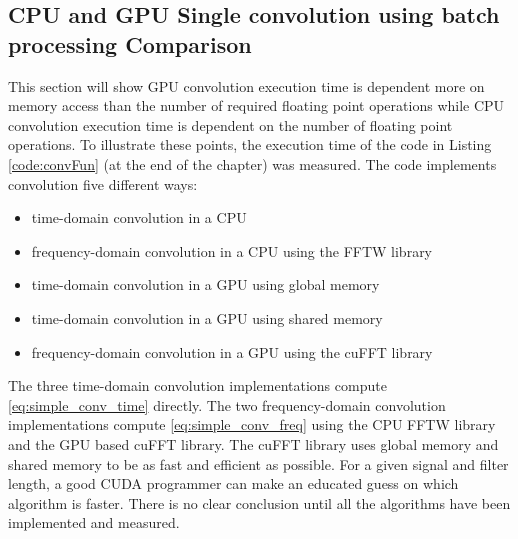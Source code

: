 \subsection{CPU and GPU Single convolution using batch processing Comparison}
\label{sec:cuda_convolution_single}
This section will show GPU convolution execution time is dependent more on memory access than the number of required floating point operations while CPU convolution execution time is dependent on the number of floating point operations.
To illustrate these points, the execution time of the code in Listing \ref{code:convFun} (at the end of the chapter) was measured.
The code implements convolution five different ways:
\begin{itemize}
  \item time-domain convolution in a CPU
  \item frequency-domain convolution in a CPU using the FFTW library
  \item time-domain convolution in a GPU using global memory
  \item time-domain convolution in a GPU using shared memory
  \item frequency-domain convolution in a GPU using the cuFFT library
\end{itemize}

The three time-domain convolution implementations compute \eqref{eq:simple_conv_time} directly.
The two \newline frequency-domain convolution implementations compute \eqref{eq:simple_conv_freq} using the CPU FFTW library and the GPU based cuFFT library.
The cuFFT library uses global memory and shared memory to be as fast and efficient as possible.
For a given signal and filter length, a good CUDA programmer can make an educated guess on which algorithm is faster.
There is no clear conclusion until all the algorithms have been implemented and measured.


